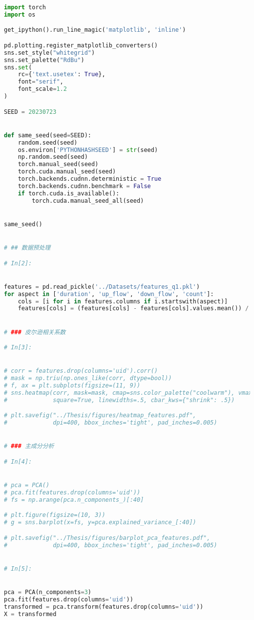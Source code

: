 \documentclass[withoutpreface,bwprint]{cumcmthesis}
\begin{document}
\begin{appendices}
\begin{lstlisting}[language=Python]
import torch
import os

get_ipython().run_line_magic('matplotlib', 'inline')

pd.plotting.register_matplotlib_converters()
sns.set_style("whitegrid")
sns.set_palette("RdBu")
sns.set(
    rc={'text.usetex': True},
    font="serif",
    font_scale=1.2
)

SEED = 20230723


def same_seed(seed=SEED):
    random.seed(seed)
    os.environ['PYTHONHASHSEED'] = str(seed)
    np.random.seed(seed)
    torch.manual_seed(seed)
    torch.cuda.manual_seed(seed)
    torch.backends.cudnn.deterministic = True
    torch.backends.cudnn.benchmark = False
    if torch.cuda.is_available():
        torch.cuda.manual_seed_all(seed)


same_seed()


# ## 数据预处理

# In[2]:


features = pd.read_pickle('../Datasets/features_q1.pkl')
for aspect in ['duration', 'up_flow', 'down_flow', 'count']:
    cols = [i for i in features.columns if i.startswith(aspect)]
    features[cols] = (features[cols] - features[cols].values.mean()) /         features[cols].values.std()


# ### 皮尔逊相关系数

# In[3]:


# corr = features.drop(columns='uid').corr()
# mask = np.triu(np.ones_like(corr, dtype=bool))
# f, ax = plt.subplots(figsize=(11, 9))
# sns.heatmap(corr, mask=mask, cmap=sns.color_palette("coolwarm"), vmax=.3, center=0,
#             square=True, linewidths=.5, cbar_kws={"shrink": .5})

# plt.savefig("../Thesis/figures/heatmap_features.pdf",
#             dpi=400, bbox_inches='tight', pad_inches=0.005)


# ### 主成分分析

# In[4]:


# pca = PCA()
# pca.fit(features.drop(columns='uid'))
# fs = np.arange(pca.n_components_)[:40]

# plt.figure(figsize=(10, 3))
# g = sns.barplot(x=fs, y=pca.explained_variance_[:40])

# plt.savefig("../Thesis/figures/barplot_pca_features.pdf",
#             dpi=400, bbox_inches='tight', pad_inches=0.005)


# In[5]:


pca = PCA(n_components=3)
pca.fit(features.drop(columns='uid'))
transformed = pca.transform(features.drop(columns='uid'))
X = transformed



\end{lstlisting}
\end{appendices}
\end{document}
